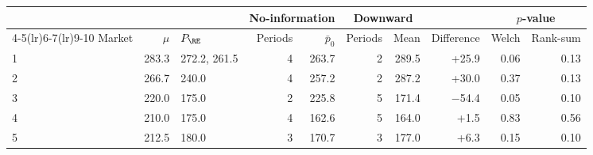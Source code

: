 \begin{tabular}{lrlrrrrrrr}
\toprule
 & & & \multicolumn{2}{c}{No-information} & \multicolumn{2}{c}{Downward} & & \multicolumn{2}{c}{$p$-value} \\
\cmidrule(lr){4-5}\cmidrule(lr){6-7}\cmidrule(lr){9-10}
Market & $\mu$ & $P_{\RE}$ & Periods & $\bar p_0$ & Periods & Mean & Difference & Welch & Rank-sum \\
\midrule
1 & 283.3 & 272.2, 261.5 & 4 & 263.7 & 2 & 289.5 & +25.9 & 0.06 & 0.13 \\
2 & 266.7 & 240.0 & 4 & 257.2 & 2 & 287.2 & +30.0 & 0.37 & 0.13 \\
3 & 220.0 & 175.0 & 2 & 225.8 & 5 & 171.4 & $-$54.4 & 0.05 & 0.10 \\
4 & 210.0 & 175.0 & 4 & 162.6 & 5 & 164.0 & +1.5 & 0.83 & 0.56 \\
5 & 212.5 & 180.0 & 3 & 170.7 & 3 & 177.0 & +6.3 & 0.15 & 0.10 \\
\bottomrule
\end{tabular}
